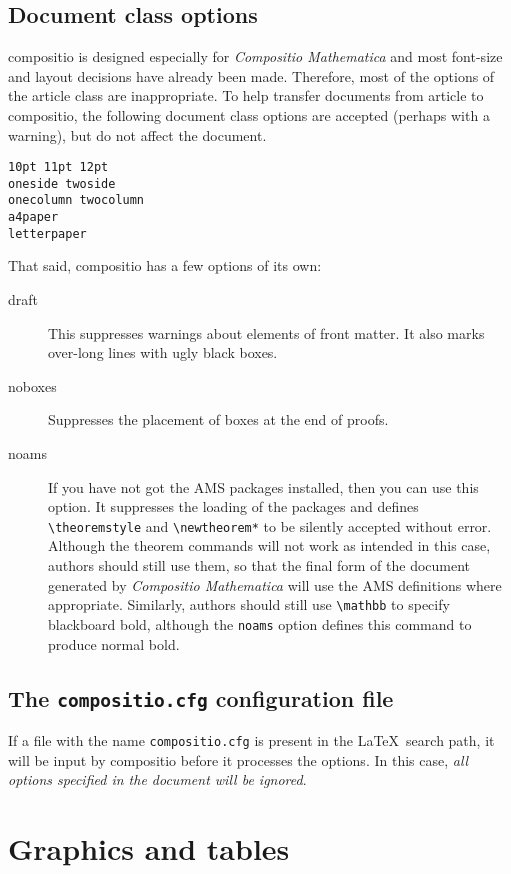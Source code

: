 \documentclass[noams]{compositio}
\newcommand*{\code}[1]{{\mdseries\texttt{#1}}}
\newcommand*{\pkg}[1]{{\mdseries\textsf{#1}}}
\begin{document}
\subsection{Document class options}
\label{sec:docum-class-opti}

\pkg{compositio} is designed especially for \emph{Compositio
Mathematica} and most font-size and layout decisions have already
been made. Therefore, most of the options of the \pkg{article}
class are inappropriate.  To help transfer documents from
\pkg{article} to \pkg{compositio}, the following document class
options are accepted (perhaps with a warning), but do not affect
the document.
\begin{verbatim}
10pt 11pt 12pt
oneside twoside
onecolumn twocolumn
a4paper
letterpaper
\end{verbatim}
That said, \pkg{compositio} has a few options of its own:
\begin{description}
\item[draft] This suppresses warnings about elements of front
matter. It also marks over-long lines with ugly black boxes.
\item[noboxes] Suppresses the placement of boxes at the end of
proofs.
\item[noams] If you have not got the AMS packages installed,
then you can use this option. It suppresses the loading
of the packages and defines \verb+\theoremstyle+ and
\verb+\newtheorem*+ to be silently accepted without error.
Although the theorem commands will not work as intended in this
case, authors should still use them, so that the final form of the
document generated by \emph{Compositio Mathematica} will use the
AMS definitions where appropriate. Similarly, authors should still
use \verb+\mathbb+ to specify blackboard bold, although the
\code{noams} option defines this command to produce normal bold.
\end{description}

\subsection{The \code{compositio.cfg} configuration file}
\label{sec:mdser-conf-file}

If a file with the name \texttt{compositio.cfg} is present in the
\LaTeX\ search path, it will be input by \pkg{compositio} before it
processes the options. In this case, \emph{all options specified in
the document will be ignored}.

\section{Graphics and tables}
\label{sec:graphics-tables}
\end{document}
